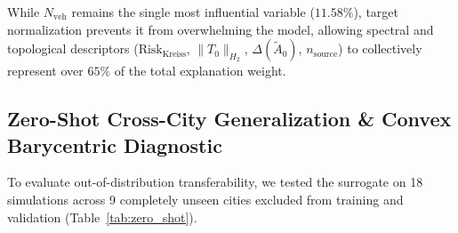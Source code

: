 \documentclass[journal]{IEEEtran}
\begin{document}
\begin{table}[htbp]
\caption{Top 10 Explanatory Features Ranked by Mean Absolute SHAP Value}
\label{tab:shap_gain}
\centering
{}
\end{table}

While $N_{\text{veh}}$ remains the single most influential variable ($11.58\%$), target normalization prevents it from overwhelming the model, allowing spectral and topological descriptors ($\text{Risk}_{\text{Kreiss}}$, $\|T_0\|_{H_2}$, $\Delta(\tilde{A}_0)$, $n_{\text{source}}$) to collectively represent over $65\%$ of the total explanation weight.

\subsection{Zero-Shot Cross-City Generalization \& Convex Barycentric Diagnostic}
To evaluate out-of-distribution transferability, we tested the surrogate on 18 simulations across 9 completely unseen cities excluded from training and validation (Table~\ref{tab:zero_shot}).
\end{document}

